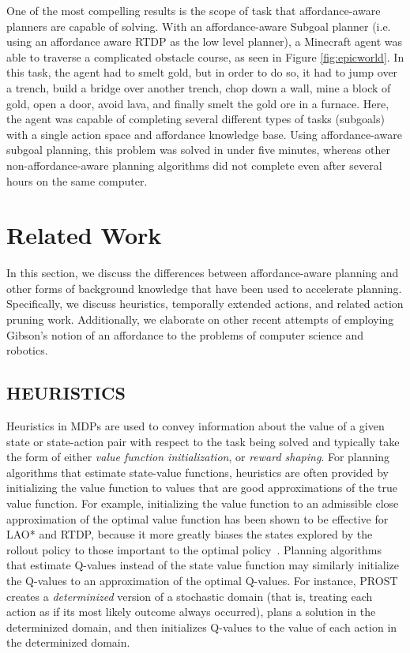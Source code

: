 \documentclass[]{article}
\begin{document}
One of the most compelling results is the scope of task that affordance-aware planners are capable of solving. With an affordance-aware Subgoal planner (i.e. using an affordance aware RTDP as the low level planner), a Minecraft agent was able to traverse a complicated obstacle course, as seen in Figure \ref{fig:epicworld}. In this task, the agent had to smelt gold, but in order to do so, it had to jump over a trench, build a bridge over another trench, chop down a wall, mine a block of gold, open a door, avoid lava, and finally smelt the gold ore in a furnace. Here, the agent was capable of completing several different types of tasks (subgoals) with a single action space and affordance knowledge base. Using affordance-aware subgoal
planning, this problem was solved in under five minutes, whereas other non-affordance-aware planning algorithms did not complete even after several hours on the same computer.

\section{Related Work}
In this section, we discuss the differences between
affordance-aware planning and other forms of background knowledge that
have been used to accelerate planning.  Specifically, we discuss
heuristics, temporally extended actions, and related action pruning
work.  Additionally, we elaborate on other recent attempts of
employing Gibson's notion of an affordance to the problems of computer
science and robotics.


\subsection{HEURISTICS}
Heuristics in MDPs are used to convey information about the value of a given state or state-action pair with respect to the task being solved and typically take the form of either {\em value function initialization},
or {\em reward shaping}. For planning algorithms that estimate state-value functions, heuristics are often
provided by initializing the value function to values that are good approximations of the true value function. For example, initializing the value function to an admissible close approximation of the optimal value function has been shown to be effective for LAO* and RTDP, because it more greatly biases the states explored by the rollout policy to those important to the optimal policy~\cite{Hansen:1999qf}. Planning algorithms that estimate Q-values instead of the state value function may similarly initialize the Q-values to an approximation of the optimal Q-values. For instance, PROST~\cite{keller2012prost} creates a {\em determinized} version of a stochastic domain (that is, treating each action as if its most likely outcome always occurred), plans a solution in the determinized domain, and then initializes Q-values to the value of each action in the determinized domain.
\end{document}

